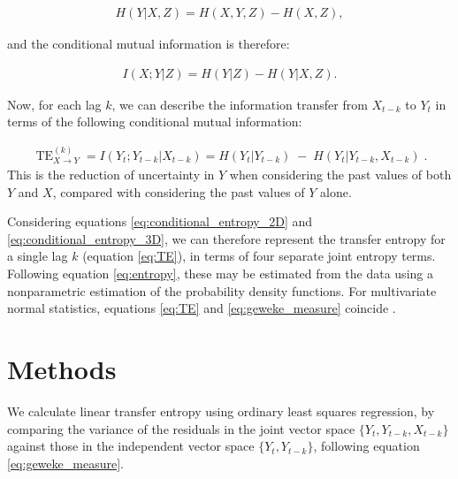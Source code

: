 \documentclass[]{rsos}%
\begin{document}
  \begin{eqnarray}
    \label{eq:conditional_entropy_3D}
    H(Y | X, Z) = H(X,Y,Z) - H(X, Z) ,
  \end{eqnarray}
  
  and the conditional mutual information is therefore:

  \begin{eqnarray}
    \label{eq:conditional_mutual_information}
    I(X;Y|Z) = H(Y|Z) - H(Y | X, Z) .
  \end{eqnarray}

  Now, for each lag $k$, we can describe the information transfer from $X_{t-k}$ to $Y_t$ in terms of the following conditional mutual information:

  \begin{eqnarray}
      \label{eq:TE}
      \operatorname{TE}^{(k)}_{\textbf{}X \rightarrow Y} = I(Y_t ;Y_{t-k} | X_{t-k} ) = H(Y_t | Y_{t-k}) \; - \;  H(Y_t | Y_{t-k}, X_{t-k} ) \;.
  \end{eqnarray}
 This is the reduction of uncertainty in $Y$ when considering the past values of both $Y$ and $X$, compared with considering the past values of $Y$ alone. 

  Considering equations \ref{eq:conditional_entropy_2D} and \ref{eq:conditional_entropy_3D}, we can therefore represent the transfer entropy for a single lag $k$ (equation \ref{eq:TE}), in terms of four separate joint entropy terms. Following equation \ref{eq:entropy}, these may be estimated from the data using a nonparametric  estimation of the probability density functions. For multivariate normal statistics, equations \ref{eq:TE} and \ref{eq:geweke_measure} coincide \cite{barnett2009granger}.


\section{Methods} \label{s.method}

  We calculate linear transfer entropy using ordinary least squares regression, by comparing the variance of the residuals in the joint vector space $ \{Y_t, Y_{t-k}, X_{t-k} \} $ against those in the independent vector space $ \{Y_t, Y_{t-k}\}$, following equation \ref{eq:geweke_measure}. 
  
\end{document}

